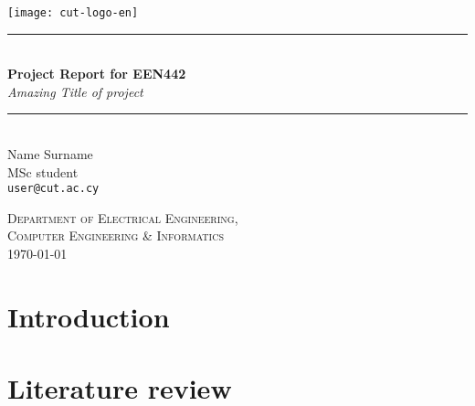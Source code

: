 \documentclass[12pt,a4paper]{article}
\newcommand{\HRule}{\rule{\linewidth}{0.5mm}}
\begin{document}
\begin{titlepage}
\begin{center}

\texttt{[image: cut-logo-en]}~\\[2cm]


\HRule \\[0.4cm]
{ \LARGE 
  \textbf{Project Report for EEN442}\\[0.4cm]
  \emph{Amazing Title of project}\\[0.4cm]
}
\HRule \\[1.5cm]



{ \large
  Name Surname \\[0.1cm]
  MSc student\\[0.1cm]
  \texttt{user@cut.ac.cy}
}

\vfill

\textsc{\large Department of Electrical Engineering,\\Computer Engineering \& Informatics}\\[0.4cm]


{\large \today}
 
\end{center}
\end{titlepage}

\begin{abstract}
\lipsum[1-2]
\end{abstract}

\newpage



\tableofcontents
{}
\newpage
\setcounter{page}{1}

\section{Introduction}\label{sec:intro}

\lipsum[1-2]

\section{Literature review}\label{sec:lit-rev}
\end{document}
